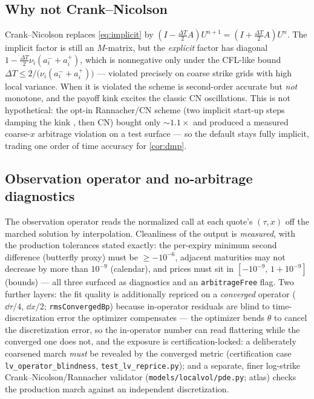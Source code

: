 \documentclass[11pt]{article}
\begin{document}
\subsection{Why not Crank--Nicolson}
\label{sec:cn}

\begin{remark}
\label{rem:cn}
Crank--Nicolson replaces \eqref{eq:implicit} by
$(I-\tfrac{\Delta T}{2}A)U^{n+1}=(I+\tfrac{\Delta T}{2}A)U^{n}$. The implicit
factor is still an $M$-matrix, but the \emph{explicit} factor has diagonal
$1-\tfrac{\Delta T}{2}\nu_i(a^-_i+a^+_i)$, which is nonnegative only under the
CFL-like bound $\Delta T\le2/\big(\nu_i(a^-_i+a^+_i)\big)$ --- violated
precisely on coarse strike grids with high local variance. When it is
violated the scheme is second-order accurate but \emph{not} monotone, and the
payoff kink excites the classic CN oscillations. This is not hypothetical: the
opt-in Rannacher/CN scheme (two implicit start-up steps damping the kink
\cite{GilesCarter2006}, then CN) bought only $\sim1.1\times$ and produced a
measured coarse-$x$ arbitrage violation on a test surface --- so the default
stays fully implicit, trading one order of time accuracy for
\cref{cor:dmp}.
\end{remark}

\subsection{Observation operator and no-arbitrage diagnostics}
\label{sec:diagnostics}

The observation operator reads the normalized call at each quote's $(\tau,x)$
off the marched solution by interpolation. Cleanliness of the output is
\emph{measured}, with the production tolerances stated exactly: the per-expiry
minimum second difference (butterfly proxy) must be $\ge-10^{-6}$, adjacent
maturities may not decrease by more than $10^{-9}$ (calendar), and prices must
sit in $[-10^{-9},\,1+10^{-9}]$ (bounds) --- all three surfaced as diagnostics
and an \texttt{arbitrageFree} flag. Two further layers: the fit quality is
additionally repriced on a \emph{converged} operator ($\dd\tau/4$, $\dd x/2$;
\texttt{rmsConvergedBp}) because in-operator residuals are blind to
time-discretization error the optimizer compensates --- the optimizer bends
$\theta$ to cancel the discretization error, so the in-operator number can
read flattering while the converged one does not, and the exposure is
certification-locked: a deliberately coarsened march \emph{must} be revealed
by the converged metric (certification case \texttt{lv\_operator\_blindness},
\nolinkurl{test_lv_reprice.py}); and a separate, finer log-strike
Crank--Nicolson/Rannacher validator (\texttt{models/localvol/pde.py}; atlas)
checks the production march against an independent discretization.
\end{document}
